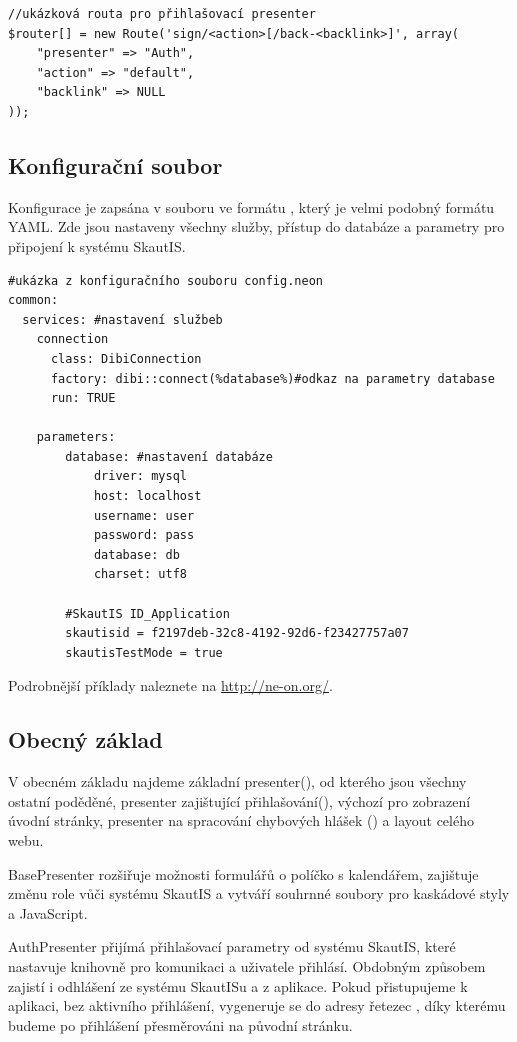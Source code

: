 \documentclass[thesis=B,czech]{FITthesis}[2011/06/14]
\begin{document}
\begin{verbatim}
//ukázková routa pro přihlašovací presenter
$router[] = new Route('sign/<action>[/back-<backlink>]', array(
    "presenter" => "Auth",
    "action" => "default",
    "backlink" => NULL
));
\end{verbatim}

\subsection{Konfigurační soubor}
Konfigurace je zapsána v souboru  ve formátu , který je velmi podobný formátu YAML. Zde jsou nastaveny všechny služby, přístup do databáze a parametry pro připojení k systému SkautIS. 
\begin{verbatim}
#ukázka z konfiguračního souboru config.neon
common:
  services: #nastavení službeb
    connection
      class: DibiConnection
      factory: dibi::connect(%database%)#odkaz na parametry database
      run: TRUE        

    parameters:
        database: #nastavení databáze
            driver: mysql
            host: localhost
            username: user
            password: pass
            database: db
            charset: utf8

        #SkautIS ID_Application
        skautisid = f2197deb-32c8-4192-92d6-f23427757a07
        skautisTestMode = true
\end{verbatim}
Podrobnější příklady naleznete na \url{http://ne-on.org/}. 


\subsection{Obecný základ}
V obecném základu najdeme základní presenter(), od kterého jsou všechny ostatní poděděné, presenter zajištující přihlašování(), výchozí  pro zobrazení úvodní stránky, presenter na spracování chybových hlášek () a layout celého webu.

BasePresenter rozšiřuje možnosti formulářů o políčko s kalendářem, zajištuje změnu role vůči systému SkautIS a vytváří souhrnné soubory pro kaskádové styly a JavaScript.

AuthPresenter přijímá přihlašovací parametry od systému SkautIS, které nastavuje knihovně pro komunikaci a uživatele přihlásí. Obdobným způsobem zajistí i odhlášení ze systému SkautISu a z aplikace. Pokud přistupujeme k aplikaci, bez aktivního přihlášení, vygeneruje se do adresy řetezec , díky kterému budeme po přihlášení přesměrováni na původní stránku.
\end{document}
